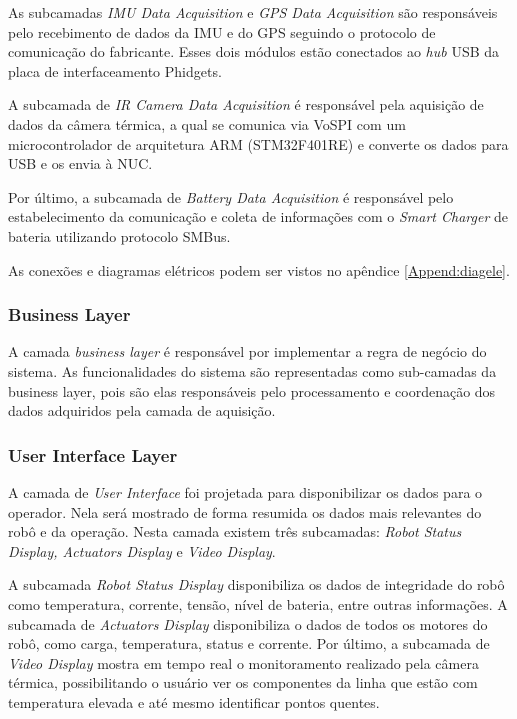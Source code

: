 As subcamadas \textit{IMU Data Acquisition} e \textit{GPS Data Acquisition} são responsáveis pelo recebimento de dados da IMU e do GPS seguindo o protocolo de comunicação do fabricante. Esses dois módulos estão conectados ao \textit{hub} USB da placa de interfaceamento Phidgets. 

A subcamada de \textit{IR Camera Data Acquisition} é responsável pela aquisição de dados da câmera térmica, a qual se comunica via VoSPI com um microcontrolador de arquitetura ARM (STM32F401RE) e converte os dados para USB e os envia à NUC. 

Por último, a subcamada de \textit{Battery Data Acquisition} é responsável pelo estabelecimento da comunicação e coleta de informações com o \textit{Smart Charger} de bateria utilizando protocolo SMBus.

As conexões e diagramas elétricos podem ser vistos no apêndice \ref{Append:diagele}.

\subsubsection{Business Layer}

A camada \textit{business layer} é responsável por implementar a regra de negócio do sistema. As funcionalidades do sistema são representadas como sub-camadas da business layer, pois são elas responsáveis pelo processamento e coordenação dos dados adquiridos pela camada de aquisição.

\subsubsection{User Interface Layer}

A camada de \textit{User Interface} foi projetada para disponibilizar os dados para o operador. Nela será mostrado de forma resumida os dados mais relevantes do robô e da operação. Nesta camada existem três subcamadas: \textit{Robot Status Display, Actuators Display} e \textit{Video Display}. 

A subcamada \textit{Robot Status Display} disponibiliza os dados de integridade do robô como temperatura, corrente, tensão, nível de bateria, entre outras informações. A subcamada de \textit{Actuators Display} disponibiliza o dados de todos os motores do robô, como carga, temperatura, status e corrente. Por último, a subcamada de \textit{Video Display} mostra em tempo real o monitoramento realizado pela câmera térmica, possibilitando o usuário ver os componentes da linha que estão com temperatura elevada e até mesmo identificar pontos quentes.

